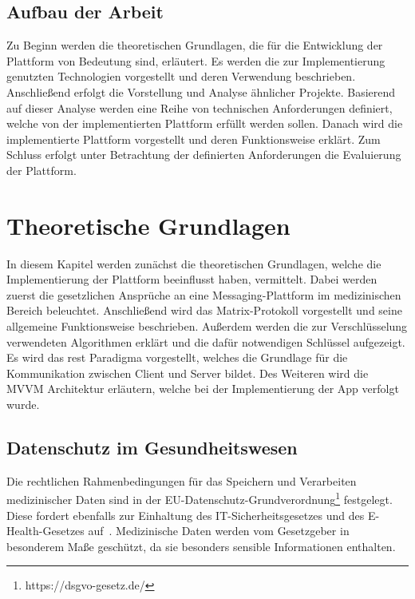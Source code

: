     \section{Aufbau der Arbeit}\label{sec:aufbau-der-arbeit}
    Zu Beginn werden die theoretischen Grundlagen, die für die Entwicklung der Plattform von Bedeutung sind, erläutert.
    Es werden die zur Implementierung genutzten Technologien vorgestellt und deren Verwendung beschrieben.
    Anschließend erfolgt die Vorstellung und Analyse ähnlicher Projekte.
    Basierend auf dieser Analyse werden eine Reihe von technischen Anforderungen definiert, welche von der implementierten Plattform erfüllt werden sollen.
    Danach wird die implementierte Plattform vorgestellt und deren Funktionsweise erklärt.
    Zum Schluss erfolgt unter Betrachtung der definierten Anforderungen die Evaluierung der Plattform.

    \newpage
    \chapter{Theoretische Grundlagen}\label{ch:theoretische-grundlagen}
    In diesem Kapitel werden zunächst die theoretischen Grundlagen, welche die Implementierung der Plattform beeinflusst haben, vermittelt.
    Dabei werden zuerst die gesetzlichen Ansprüche an eine Messaging-Plattform im medizinischen Bereich beleuchtet.
    Anschließend wird das Matrix-Protokoll vorgestellt und seine allgemeine Funktionsweise beschrieben.
    Außerdem werden die zur Verschlüsselung verwendeten Algorithmen erklärt und die dafür notwendigen Schlüssel aufgezeigt.
    Es wird das \acs{rest} Paradigma vorgestellt, welches die Grundlage für die Kommunikation zwischen Client und Server bildet.
    Des Weiteren wird die MVVM Architektur erläutern, welche bei der Implementierung der App verfolgt wurde.

    \section{Datenschutz im Gesundheitswesen}\label{sec:datenschutz-im-gesundheitswesen}
    Die rechtlichen Rahmenbedingungen für das Speichern und Verarbeiten medizinischer Daten sind in der EU-Datenschutz-Grundverordnung\footnote{https://dsgvo-gesetz.de/} festgelegt.
    Diese fordert ebenfalls zur Einhaltung des IT-Sicherheitsgesetzes und des E-Health-Gesetzes auf~\cite{datenschutzimgesundeitswesen}.
    Medizinische Daten werden vom Gesetzgeber in besonderem Maße geschützt, da sie besonders sensible Informationen enthalten.

